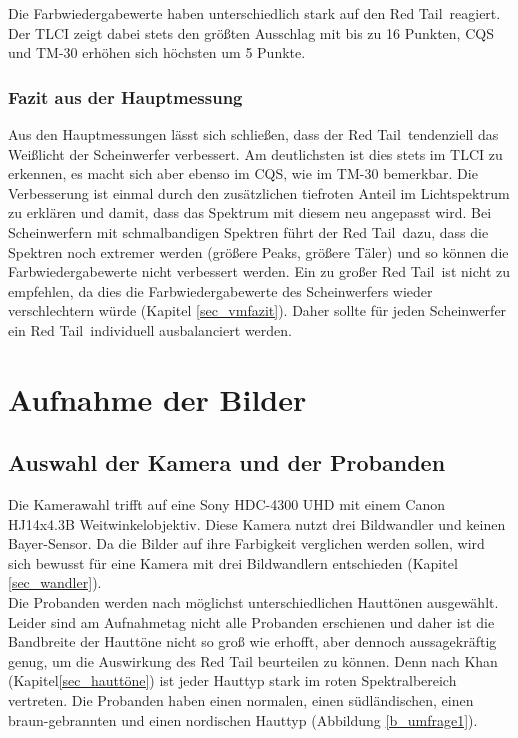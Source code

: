 Die Farbwiedergabewerte haben unterschiedlich stark auf den \glqq Red Tail\grqq\ reagiert. Der TLCI zeigt dabei stets den größten Ausschlag mit bis zu 16 Punkten, CQS und TM-30 erhöhen sich höchsten um 5 Punkte. 


\subsection{Fazit aus der Hauptmessung}
\label{sec_fazithm}
Aus den Hauptmessungen lässt sich schließen, dass der \glqq Red Tail\grqq\ tendenziell das Weißlicht der Scheinwerfer verbessert. Am deutlichsten ist dies stets im TLCI zu erkennen, es macht sich aber ebenso im CQS, wie im TM-30 bemerkbar. Die Verbesserung ist einmal durch den zusätzlichen tiefroten Anteil im Lichtspektrum zu erklären und damit, dass das Spektrum mit diesem neu angepasst wird. Bei Scheinwerfern mit schmalbandigen Spektren führt der \glqq Red Tail\grqq\ dazu, dass die Spektren noch extremer werden (größere Peaks, größere Täler) und so können die Farbwiedergabewerte nicht verbessert werden. Ein zu großer \glqq Red Tail\grqq\ ist nicht zu empfehlen, da dies die Farbwiedergabewerte des Scheinwerfers wieder verschlechtern würde (Kapitel \ref{sec_vmfazit}). Daher sollte für jeden Scheinwerfer ein \glqq Red Tail\grqq\ individuell ausbalanciert werden.


\chapter{Aufnahme der Bilder}

\section{Auswahl der Kamera und der Probanden}
\label{sec_wahlderKamera}

Die Kamerawahl trifft auf eine Sony HDC-4300 UHD mit einem  Canon HJ14x4.3B Weitwinkelobjektiv. Diese Kamera nutzt drei Bildwandler und keinen Bayer-Sensor. Da die Bilder auf ihre Farbigkeit verglichen werden sollen, wird sich bewusst für eine Kamera mit drei Bildwandlern entschieden (Kapitel \ref{sec_wandler}).\\

Die Probanden werden nach möglichst unterschiedlichen Hauttönen ausgewählt. Leider sind am Aufnahmetag nicht alle Probanden erschienen und daher ist die Bandbreite der Hauttöne nicht so groß wie erhofft, aber dennoch aussagekräftig genug, um die Auswirkung des Red Tail beurteilen zu können. Denn nach Khan (Kapitel\ref{sec_hauttöne}) ist jeder Hauttyp stark im roten Spektralbereich vertreten. Die Probanden haben einen normalen, einen südländischen, einen braun-gebrannten und einen nordischen Hauttyp (Abbildung \ref{b_umfrage1}). 

